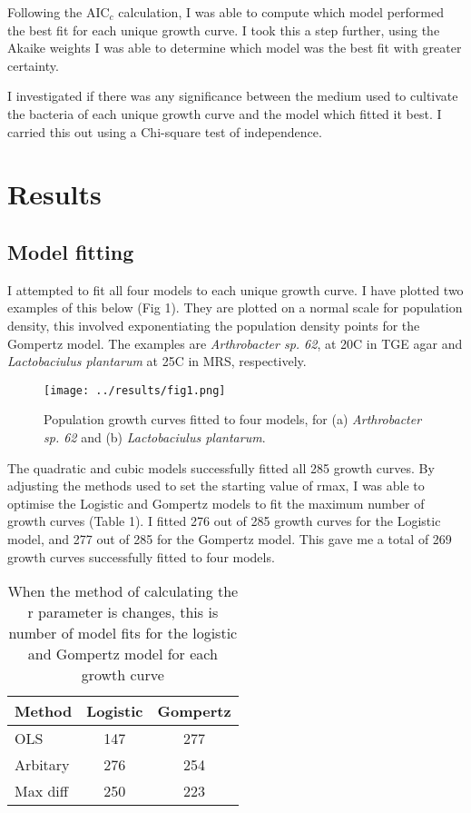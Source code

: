 \documentclass[11pt]{article}
\begin{document}
Following the AIC$_c$ calculation, I was able to compute which model performed the best fit for each unique growth curve. I took this a step further, using the Akaike weights I was able to determine which model was the best fit with greater certainty. 

I investigated if there was any significance between the medium used to cultivate the bacteria of each unique growth curve and the model which fitted it best. I carried this out using a Chi-square test of independence.

\section{Results}
\subsection{Model fitting}
I attempted to fit all four models to each unique growth curve. I have plotted two examples of this below (Fig 1). They are plotted on a normal scale for population density, this involved exponentiating the population density points for the Gompertz model. The examples are \textit{Arthrobacter sp. 62}, at 20\degree C in TGE agar and \textit{Lactobaciulus plantarum} at 25\degree C in MRS, respectively. 

\begin{figure}[htbp]
		\centering
		\texttt{[image: ../results/fig1.png]}
		\caption{Population growth curves fitted to four models, for (a) \textit{Arthrobacter sp. 62} and (b) \textit{Lactobaciulus plantarum}.} 
		\label{Figure 1}
	\end{figure}
 

The quadratic and cubic models successfully fitted all 285 growth curves. By adjusting the methods used to set the starting value of r\textunderscore max, I was able to optimise the Logistic and Gompertz models to fit the maximum number of growth curves (Table 1). I fitted 276 out of 285 growth curves for the Logistic model, and 277 out of 285 for the Gompertz model. This gave me a total of 269 growth curves successfully fitted to four models. 

\begin{table}[h]
    \caption{When the method of calculating the r parameter is changes, this is number of model fits for the logistic and Gompertz model for each growth curve}
    \centering
    \begin{tabular}{l|c |c }
    Method & Logistic & Gompertz \\\hline
    OLS & 147 & 277 \\
    Arbitary & 276 & 254 \\
    Max diff & 250 & 223
    \end{tabular}
    \end{table}
\end{document}
